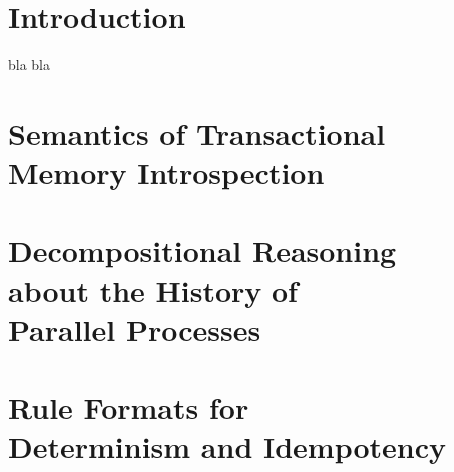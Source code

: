 \documentclass[10pt]{book}
\makeatletter
\let \cite = \citep
\theoremstyle{definition}
\theoremstyle{definition}
\newcommand\jointwith\relax
\renewcommand\tableofcontents{%
    \if@twocolumn
      \@restonecoltrue\onecolumn
    \else
      \@restonecolfalse
    \fi
    \chapter*{\contentsname
        \@mkboth{%
           {\upshape\scshape\MakeLowercase\contentsname}}{{\upshape\scshape\MakeLowercase\contentsname}}}%
    \@starttoc{toc}%
    \if@restonecol\twocolumn\fi
    }
\makeatother
\begin{document}
\tableofcontents

\mainmatter{}

\chapter{Introduction}

bla bla \cite{DeNicola:1990} 

\renewcommand{\jointwith}{\'Ulfar Erlingsson}
\chapter{Semantics of Transactional Memory Introspection}








\renewcommand{\jointwith}{Luca Aceto, Anna Ing\'olfsdottir,\\ and MohammadReza Mousavi}
\chapter[Decompositional Reasoning about the History of Parallel Processes]{Decompositional Reasoning \\ about the History of \\ Parallel Processes}







\renewcommand{\trans}[1]{\,{\stackrel{{#1}}{\rightarrow}}\,}

\renewcommand{\jointwith}{Luca Aceto, Anna Ing\'olfsdottir,\\ MohammadReza Mousavi and Michel Reniers}
\chapter[Rule Formats for Determinism and Idempotency]{Rule Formats for \\ Determinism and Idempotency}








\end{document}
